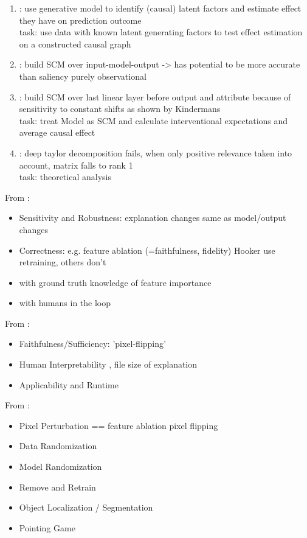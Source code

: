 {\begin{enumerate}
      \item \cite{Parafita2019}: use generative model to identify (causal) latent factors and estimate effect they have on prediction outcome
            \\ task: use data with known latent generating factors to test effect estimation on a constructed causal graph
      \item \cite{Narendra2018}: build SCM over input-model-output -> has potential to be more accurate than saliency purely observational
      \item \cite{Chattopadhyay2019}: build SCM over last linear layer before output and attribute because of sensitivity to constant shifts as shown by Kindermans
            \\ task: treat Model as SCM and calculate interventional expectations and average causal effect
      \item \cite{Sixt2022}: deep taylor decomposition fails, when only positive relevance taken into account, matrix falls to rank 1 \\ task: theoretical analysis
\end{enumerate}
}


From \cite{Yang2019}:
\begin{itemize}
    \item Sensitivity and Robustness: explanation changes same as model/output changes \cite{Adebayo2018,Ghorbani2019a}
    \item Correctness: e.g. feature ablation (=faithfulness, fidelity) \cite{Samek2017a,Fong2017,Hooker2019} Hooker use retraining, others don't
    \item with ground truth knowledge of feature importance \cite{Kim2018, Yang2019, Clark2023,Arras2022,Bau2017,Parafita2019,Singla2022}
    \item with humans in the loop \cite{Singla2022, Ribeiro2016, Rong2023,Kim2018}
\end{itemize}

From \cite{Samek2021}:
\begin{itemize}
    \item Faithfulness/Sufficiency: 'pixel-flipping' \cite{Samek2017}
    \item Human Interpretability \cite{Kim2018}, file size of explanation
    \item Applicability and Runtime
\end{itemize}

From \cite{Arras2022}:
\begin{itemize}
    \item Pixel Perturbation == feature ablation pixel flipping \cite{Samek2017a, Samek2021, Bach2015, Lundberg2017}
    \item Data Randomization \cite{Adebayo2018}
    \item Model Randomization \cite{Adebayo2018,Sixt2020}
    \item Remove and Retrain \cite{Hooker2019}
    \item Object Localization / Segmentation \cite{Simonyan2014}
    \item Pointing Game
\end{itemize}


